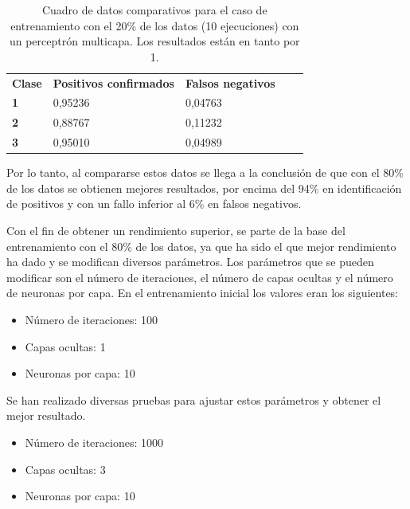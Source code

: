 \documentclass[10pt,a4paper]{article}
\begin{document}
\begin{table}[h!]
\centering
\begin{tabular}{|l|l|l|ll}
\cline{1-3}
\multicolumn{1}{|c|}{\textbf{Clase}} & \multicolumn{1}{c|}{\textbf{Positivos confirmados}} & \multicolumn{1}{c|}{\textbf{Falsos negativos}} & \multicolumn{1}{c}{\textbf{}} &  \\ \cline{1-3}
\textbf{1}                       &         0,95236                       &       0,04763                         &                               &  \\ \cline{1-3}
\textbf{2}                       &         0,88767 
&       0,11232 
&                               &  \\ \cline{1-3}
\textbf{3}                       &         0,95010                       &       0,04989 &                               &  \\ \cline{1-3}
\end{tabular}
\caption{Cuadro de datos comparativos para el caso de entrenamiento con el 20\%{} de los datos (10 ejecuciones) con un perceptrón multicapa. Los resultados están en tanto por 1.}
\label{tab:ej5_20porcent}
\end{table}

Por lo tanto, al compararse estos datos se llega a la conclusión de que con el 80\%{} de los datos se obtienen mejores resultados, por encima del 94\%{} en identificación de positivos y con un fallo inferior al 6\%{} en falsos negativos.

Con el fin de obtener un rendimiento superior, se parte de la base del entrenamiento con el 80\%{} de los datos, ya que ha sido el que mejor rendimiento ha dado y se modifican diversos parámetros. Los parámetros que se pueden modificar son el número de iteraciones, el número de capas ocultas y el número de neuronas por capa. En el entrenamiento inicial los valores eran los siguientes: \\
\begin{itemize}
	\item Número de iteraciones: 100
	\item Capas ocultas: 1  
	\item Neuronas por capa: 10
	
\end{itemize}

Se han realizado diversas pruebas para ajustar estos parámetros y obtener el mejor resultado.\\
\par
\begin{itemize}
	\item Número de iteraciones: 1000
	\item Capas ocultas: 3  
	\item Neuronas por capa: 10
\end{itemize}
\end{document}
